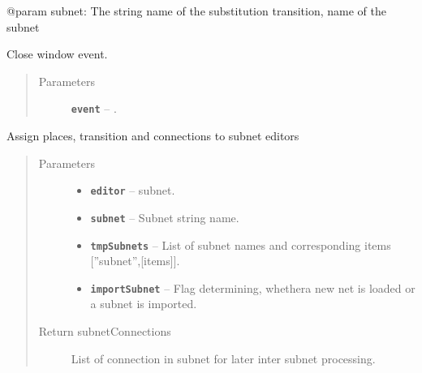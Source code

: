 \documentclass[a4paper,10pt,english]{sphinxmanual}
\begin{document}
\begin{fulllineitems}
\begin{fulllineitems}
@param subnet: The string name of the substitution transition, name of the subnet

\end{fulllineitems}


\begin{fulllineitems}
\label{gui_link:gui.MainWindow.MainWindow.closeEvent}
Close window event.
\begin{quote}\begin{description}
\item[{Parameters}] \leavevmode
\textbf{\texttt{event}} -- .

\end{description}\end{quote}

\end{fulllineitems}


\begin{fulllineitems}
\label{gui_link:gui.MainWindow.MainWindow.createItemsAssignToEditor}
Assign places, transition and connections to subnet editors
\begin{quote}\begin{description}
\item[{Parameters}] \leavevmode\begin{itemize}
\item {} 
\textbf{\texttt{editor}} --  subnet.

\item {} 
\textbf{\texttt{subnet}} -- Subnet string name.

\item {} 
\textbf{\texttt{tmpSubnets}} -- List of subnet names and corresponding items {[}''subnet'',{[}items{]}{]}.

\item {} 
\textbf{\texttt{importSubnet}} -- Flag determining, whethera new net is loaded or a subnet is imported.

\end{itemize}

\item[{Return subnetConnections}] \leavevmode
List of connection in subnet for later inter subnet processing.


\end{description}
\end{quote}
\end{fulllineitems}
\end{fulllineitems}
\end{document}
